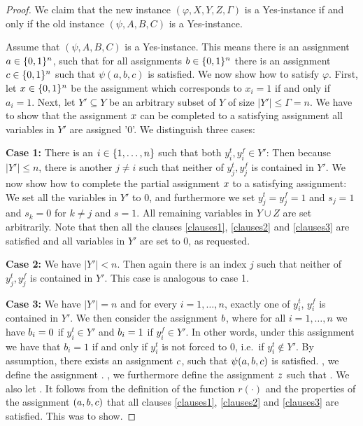 \begin{proof}
We claim that the new instance $(\varphi,X,Y,Z, \Gamma)$ is a Yes-instance if and only if the old instance $(\psi,A,B,C)$ is a Yes-instance.

Assume that $(\psi,A,B,C)$ is a Yes-instance. This means there is an assignment $a \in \{ 0,1 \}^n$, such that for all assignments $b \in \{ 0,1 \}^n$ there is an assignment $c \in \{ 0,1 \}^n$ such that $\psi(a,b,c)$ is satisfied. 
We now show how to satisfy $\varphi$. 
First, let $x \in \{ 0,1 \}^n$ be the assignment which corresponds to  $x_i=1$ if and only if $a_i=1$. 
Next, let $Y' \subseteq Y$ be an arbitrary subset of $Y$ of size $|Y'| \leq \Gamma = n$. 
We have to show that the assignment $x$ can be completed to a satisfying assignment  all variables in $Y'$ are assigned '0'.  We distinguish three cases:

\textbf{Case 1:} There is an $i \in \{ 1, \ldots, n \}$ such that both $y_i^t,y_i^f \in Y'$: Then because $|Y'| \leq n$, there is another $j \neq i$ such that neither of $y^t_j, y^f_j$ is contained in $Y'$. 
We now show how to complete the partial assignment $x$ to a satisfying assignment: We set all the variables in $Y'$ to 0, and furthermore we set $y^t_j=y^f_j=1$ and $s_j=1$ and $s_k=0$ for $k \neq j$ and $s=1$. 
All remaining variables in $Y \cup Z$ are set arbitrarily. Note that then all the clauses \eqref{clauses1}, \eqref{clauses2} and \eqref{clauses3} are satisfied and all variables in $Y'$ are set to 0, as requested.

\textbf{Case 2:} We have $|Y'| < n$. Then again there is an index $j$ such that neither of $y^t_j, y^f_j$ is contained in $Y'$. This case is analogous to case 1.

\textbf{Case 3:} We have $|Y'| = n$ and for every $i=1,\dots,n$, exactly one of $y_i^t$, $y^f_i$ is contained in $Y'$. 
We then consider the assignment $b$, where for all $i=1,\dots,n$ we have $b_i = 0$ if $y_i^t \in Y'$ and $b_i = 1$ if $y_i^f \in Y'$. 
In other words, under this assignment we have that $b_i = 1$ if and only if $y^t_i$ is not forced to 0, i.e.\ if $y^t_i \not\in Y'$. 
By assumption, there exists an assignment $c$, such that $\psi(a,b,c)$ is satisfied. 
, we define the assignment . 
, we furthermore define the assignment $z$ such that . 
We also let . 
It follows from the definition of the function $r(\cdot)$ and the properties of the assignment $(a,b,c)$ that all clauses \eqref{clauses1}, \eqref{clauses2} and \eqref{clauses3} are satisfied. This was to show.


\end{proof}
